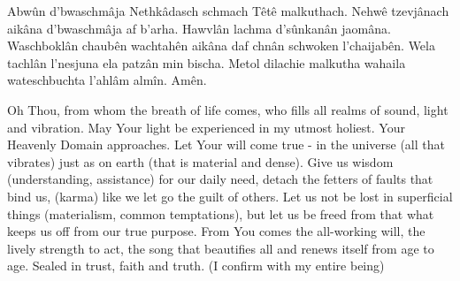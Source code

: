 
  \large\chordsoff
  \beginverse
    Abwûn d'bwaschmâja
  \endverse
  \beginverse
    Nethkâdasch schmach
  \endverse
  \beginverse
    Têtê malkuthach.
  \endverse
  \beginverse
    Nehwê tzevjânach aikâna d'bwaschmâja af b'arha.
  \endverse
  \beginverse
    Hawvlân lachma d'sûnkanân jaomâna.
  \endverse
  \beginverse
    Waschboklân chaubên wachtahên aikâna
    daf chnân schwoken l'chaijabên.
  \endverse
  \beginverse
    Wela tachlân l'nesjuna
  \endverse
  \beginverse
    ela patzân min bischa.
  \endverse
  \beginverse
    Metol dilachie malkutha wahaila wateschbuchta l'ahlâm almîn.
  \endverse
  \beginverse
    Amên.
  \endverse
  
  \begin{translation}
    Oh Thou, from whom the breath of life comes,
    who fills all realms of sound, light and vibration. 
    \nextverse
    May Your light be experienced in my utmost holiest. 
    \nextverse
    Your Heavenly Domain approaches. 
    \nextverse
    Let Your will come true - in the universe (all that vibrates)
    just as on earth (that is material and dense). 
    \nextverse
    Give us wisdom (understanding, assistance) for our daily need, 
    \nextverse
    detach the fetters of faults that bind us, (karma)
    like we let go the guilt of others. 
    \nextverse
    Let us not be lost in superficial things (materialism, common temptations), 
    \nextverse
    but let us be freed from that what keeps us off from our true purpose. 
    \nextverse
    From You comes the all-working will, the lively strength to act,
    the song that beautifies all and renews itself from age to age. 
    \nextverse
    Sealed in trust, faith and truth.
    (I confirm with my entire being)    
  \end{translation}
\endsong


